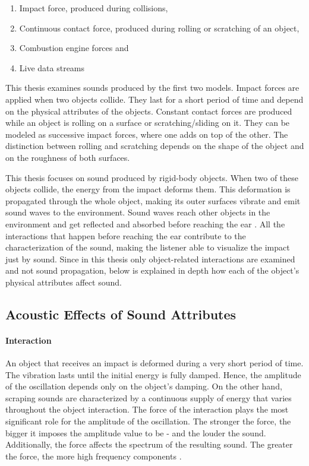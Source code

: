 \begin{enumerate}
\item Impact force, produced during collisions,
\item Continuous contact force, produced during rolling or scratching of an object,
\item Combustion engine forces and
\item Live data streams
\end{enumerate}

This thesis examines sounds produced by the first two models. Impact forces are applied when two objects collide. They last for a short period of time and depend on the physical attributes of the objects. Constant contact forces are produced while an object is rolling on a surface or scratching/sliding on it. They can be modeled as successive impact forces, where one adds on top of the other. The distinction between rolling and scratching depends on the shape of the object and on the roughness of both surfaces.

This thesis focuses on sound produced by rigid-body objects. When two of these objects collide, the energy from the impact deforms them. This deformation is propagated through the whole object, making its outer surfaces vibrate and emit sound waves to the environment. Sound waves reach other objects in the environment and get reflected and absorbed before reaching the ear \cite{van1998sounds}. All the interactions that happen before reaching the ear contribute to the characterization of the sound, making the listener able to visualize the impact just by sound. Since in this thesis only object-related interactions are examined and not sound propagation, below is explained in depth how each of the object's physical attributes affect sound.


\subsection{Acoustic Effects of Sound Attributes}\label{sec:attributes}

\paragraph{Interaction}
\hfill \break

An object that receives an impact is deformed during a very short period of time. The vibration lasts until the initial energy is fully damped. Hence, the amplitude of the oscillation depends only on the object's damping. On the other hand, scraping sounds are characterized by a continuous supply of energy that varies throughout the object interaction. The force of the interaction plays the most significant role for the amplitude of the oscillation. The stronger the force, the bigger it imposes the amplitude value to be - and the louder the sound. Additionally, the force affects the spectrum of the resulting sound. The greater the force, the more high frequency components \cite{gaver1993world}.

